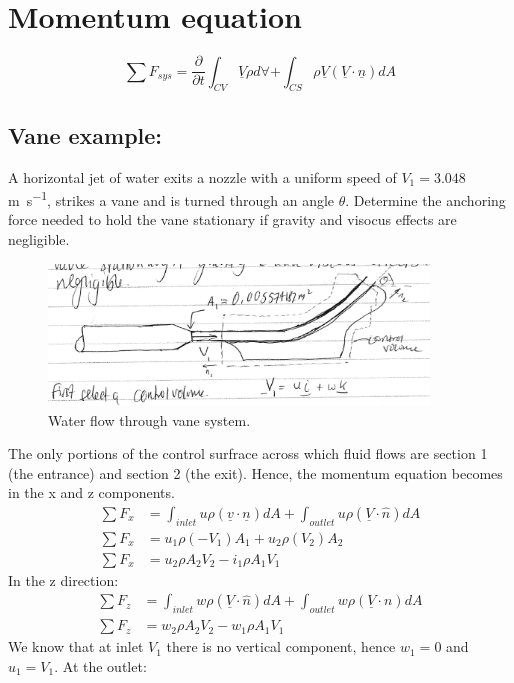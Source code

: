 \documentclass[class=report, crop=false, 12pt,a4paper]{standalone}
\begin{document}
\section{Momentum equation}
\begin{equation}
  \sum F_{sys} = \frac{\partial}{\partial t} \int_{CV} \underline{V} \rho d \forall + \int_{CS} \rho \underline{V} (\underline{V} \cdot \underline{n}) dA
\end{equation}
\subsection{Vane example:}
A horizontal jet of water exits a nozzle with a uniform speed of $V_1 = 3.048$ \si{\meter\per\second}, strikes a vane and is turned through an angle $\theta$. Determine the anchoring force needed to hold the vane stationary if gravity and visocus effects are negligible. 
\begin{figure}[h]
  \centering
  \includegraphics[width = 0.9\textwidth]{../img/Vanexample}
  \caption{Water flow through vane system.}
\end{figure}
The only portions of the control surfrace across which fluid flows are section 1 (the entrance) and section 2 (the exit). Hence, the momentum equation becomes in the x and z components.
\begin{align}
  \sum F_x &= \int_{inlet} u \rho (\underline{v} \cdot \underline{n}) dA + \int_{outlet} u \rho (\underline{V} \cdot \hat{n}) dA\\
  \sum F_x &= u_1 \rho (-V_1) A_1 + u_2 \rho (V_2) A_2\\
  \sum F_x &= u_2 \rho A_2 V_2 - i_1 \rho A_1 V_1
\end{align}
In the z direction:
\begin{align}
  \sum F_z &= \int_{inlet} w \rho (\underline{V}\cdot \hat{n}) dA + \int_{outlet} w \rho (\underline{V} \cdot {n}) dA\\
  \sum F_z &= w_2 \rho A_2 V_2 - w_1 \rho A_1 V_1
\end{align}
We know that at inlet $V_1$ there is no vertical component, hence $w_1 = 0$ and $u_1 = V_1$. At the outlet:
\end{document}
